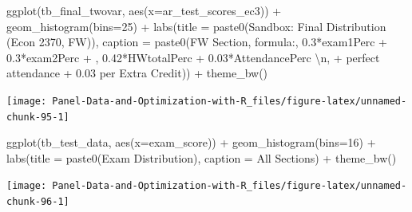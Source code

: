 \documentclass[
]{book}
\newenvironment{Shaded}{\begin{snugshade}}{\end{snugshade}}
\newcommand{\AttributeTok}[1]{\textcolor[rgb]{0.77,0.63,0.00}{#1}}
\newcommand{\DecValTok}[1]{\textcolor[rgb]{0.00,0.00,0.81}{#1}}
\newcommand{\FunctionTok}[1]{\textcolor[rgb]{0.00,0.00,0.00}{#1}}
\newcommand{\NormalTok}[1]{#1}
\newcommand{\SpecialCharTok}[1]{\textcolor[rgb]{0.00,0.00,0.00}{#1}}
\newcommand{\StringTok}[1]{\textcolor[rgb]{0.31,0.60,0.02}{#1}}
\begin{document}
\begin{Shaded}
\begin{Highlighting}[]
\FunctionTok{ggplot}\NormalTok{(tb\_final\_twovar, }\FunctionTok{aes}\NormalTok{(}\AttributeTok{x=}\NormalTok{ar\_test\_scores\_ec3)) }\SpecialCharTok{+}
  \FunctionTok{geom\_histogram}\NormalTok{(}\AttributeTok{bins=}\DecValTok{25}\NormalTok{) }\SpecialCharTok{+}
  \FunctionTok{labs}\NormalTok{(}\AttributeTok{title =} \FunctionTok{paste0}\NormalTok{(}\StringTok{\textquotesingle{}Sandbox: Final Distribution (Econ 2370, FW)\textquotesingle{}}\NormalTok{),}
       \AttributeTok{caption =} \FunctionTok{paste0}\NormalTok{(}\StringTok{\textquotesingle{}FW Section, formula:\textquotesingle{}}\NormalTok{,}
                        \StringTok{\textquotesingle{}0.3*exam1Perc + 0.3*exam2Perc + \textquotesingle{}}\NormalTok{,}
                        \StringTok{\textquotesingle{}0.42*HWtotalPerc + 0.03*AttendancePerc }\SpecialCharTok{\textbackslash{}n}\StringTok{\textquotesingle{}}\NormalTok{,}
                        \StringTok{\textquotesingle{}+ perfect attendance + 0.03 per Extra Credit\textquotesingle{}}\NormalTok{)) }\SpecialCharTok{+}
  \FunctionTok{theme\_bw}\NormalTok{()}
\end{Highlighting}
\end{Shaded}

\begin{center}\texttt{[image: Panel-Data-and-Optimization-with-R\_files/figure-latex/unnamed-chunk-95-1]} \end{center}

\begin{Shaded}
\begin{Highlighting}[]
\FunctionTok{ggplot}\NormalTok{(tb\_test\_data, }\FunctionTok{aes}\NormalTok{(}\AttributeTok{x=}\NormalTok{exam\_score)) }\SpecialCharTok{+}
  \FunctionTok{geom\_histogram}\NormalTok{(}\AttributeTok{bins=}\DecValTok{16}\NormalTok{) }\SpecialCharTok{+}
  \FunctionTok{labs}\NormalTok{(}\AttributeTok{title =} \FunctionTok{paste0}\NormalTok{(}\StringTok{\textquotesingle{}Exam Distribution\textquotesingle{}}\NormalTok{),}
       \AttributeTok{caption =} \StringTok{\textquotesingle{}All Sections\textquotesingle{}}\NormalTok{) }\SpecialCharTok{+}
  \FunctionTok{theme\_bw}\NormalTok{()}
\end{Highlighting}
\end{Shaded}

\begin{center}\texttt{[image: Panel-Data-and-Optimization-with-R\_files/figure-latex/unnamed-chunk-96-1]} \end{center}
\end{document}
